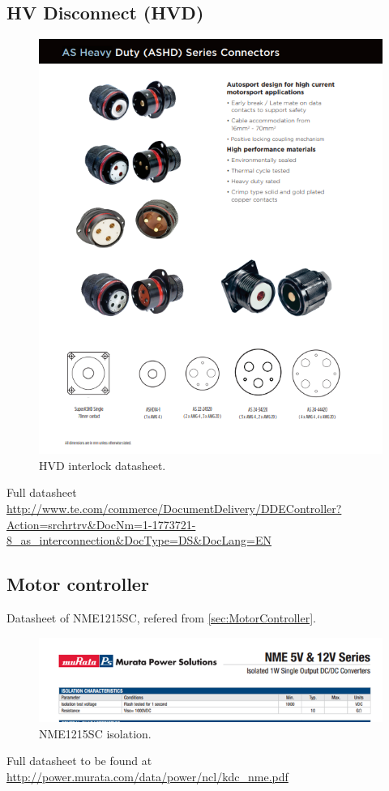 \subsection{HV Disconnect (HVD)}

\begin{figure}[H]
	\centering
	\includegraphics[width=\textwidth]{./img/app-HVD.png}
	\caption{HVD interlock datasheet.}
	\label{app:HVD}
\end{figure}

Full datasheet \url{http://www.te.com/commerce/DocumentDelivery/DDEController?Action=srchrtrv&DocNm=1-1773721-8_as_interconnection&DocType=DS&DocLang=EN}

\subsection{Motor controller}

Datasheet of NME1215SC, refered from \ref{sec:MotorController}.
\begin{figure}[H]
	\centering
	\includegraphics[width=\textwidth]{./img/NME1215SC.png}
	\caption{NME1215SC isolation.}
	\label{app:NME1215SC}
\end{figure}
Full datasheet to be found at \url{http://power.murata.com/data/power/ncl/kdc_nme.pdf}

